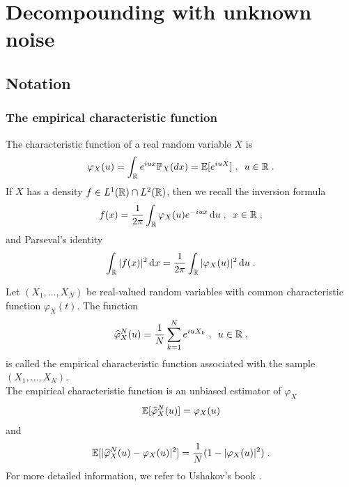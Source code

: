 \section{Decompounding with unknown noise}
\label{S:decompounding}

\subsection{Notation}
\label{part:notation}

\subsubsection*{The empirical characteristic function}

The characteristic function of a real random variable $X$ is
	\begin{equation*}
	\varphi_X(u) = \int_{\mathbb{R}} e^{i u x}\mathbb{P}_X(dx) =\mathbb{E}[e^{iuX}]
    \; , \enspace u \in \mathbb{R}
	\; .
	\end{equation*}	
If $X$ has a density $f \in L^1(\mathbb{R}) \cap L^2(\mathbb{R})$, then we recall the inversion formula
\begin{equation*}
    f(x) = \frac{1}{2\pi}\int_{\mathbb{R}} \varphi_X(u) e^{-iux} \,\mathrm{d} u
    \; , \enspace
    x \in \mathbb{R}
    \; ,
\end{equation*}
and Parseval's identity 
\begin{equation*}
    \int_{\mathbb{R}} |f(x)|^2 \,\mathrm{d} x = \frac{1}{2\pi}\int_{\mathbb{R}} |\varphi_X(u)|^2 \,\mathrm{d} u
    \; .
\end{equation*}

Let $(X_1, \ldots, X_N)$ be \iid real-valued random variables with common characteristic function $\varphi_X(t)$. The function
    \begin{equation*}
        \widehat \varphi_X^N(u) = \frac{1}{N} \sum_{k=1}^N e^{iuX_k}
        \; , \enspace
        u \in \mathbb{R} 
        \; ,
    \end{equation*}
is called the empirical characteristic function associated with the sample $(X_1, \ldots, X_N)$. \\

The empirical characteristic function is an unbiased estimator of $\varphi_X$ \ie $$\mathbb{E} [\widehat \varphi_X^N(u)] = \varphi_X(u)$$ and
\begin{equation}\label{varECF}
    \mathbb{E} [|\widehat \varphi_X^N(u) - \varphi_X(u)|^2] = \frac{1}{N}(1 - |\varphi_X(u)|^2)
    \; .
\end{equation}
For more detailed information, we refer to Ushakov's book \cite{ushakov2011selected}.



